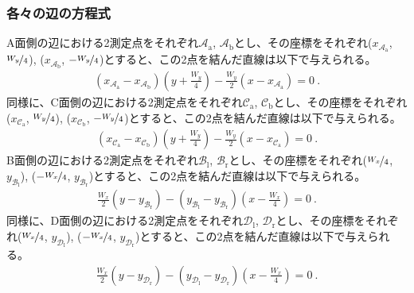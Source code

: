 \subsubsection{各々の辺の方程式}
A面側の辺における2測定点をそれぞれ$\mathcal A_\mathrm a$, $\mathcal A_\mathrm b$とし、その座標をそれぞれ($x_{\mathcal A_\mathrm a}$, $\nicefrac{W_y}4$), ($x_{\mathcal A_\mathrm b}$, $-\nicefrac{W_y}4$)とすると、この2点を結んだ直線は以下で与えられる。
\begin{align*}
  \left(x_{\mathcal A_\mathrm a}-x_{\mathcal A_\mathrm b}\right)\left(y+\frac{W_y}4\right)
  -\frac{W_y}2\left(x-x_{\mathcal A_\mathrm a}\right)
  = 0\ .
\end{align*}
同様に、C面側の辺における2測定点をそれぞれ$\mathcal C_\mathrm a$, $\mathcal C_\mathrm b$とし、その座標をそれぞれ($x_{\mathcal C_\mathrm a}$, $\nicefrac{W_y}4$), ($x_{\mathcal C_\mathrm b}$, $-\nicefrac{W_y}4$)とすると、この2点を結んだ直線は以下で与えられる。
\begin{align*}
  \left(x_{\mathcal C_\mathrm a}-x_{\mathcal C_\mathrm b}\right)\left(y+\frac{W_y}4\right)
  -\frac{W_y}2\left(x-x_{\mathcal C_\mathrm a}\right)
  = 0\ .
\end{align*}
B面側の辺における2測定点をそれぞれ$\mathcal B_\mathrm l$, $\mathcal B_\mathrm r$とし、その座標をそれぞれ($\nicefrac{W_x}4$, $y_{\mathcal B_\mathrm l}$), ($-\nicefrac{W_x}4$, $y_{\mathcal B_\mathrm r}$)とすると、この2点を結んだ直線は以下で与えられる。
\begin{align*}
  \frac{W_x}2\left(y-y_{\mathcal B_\mathrm r}\right)
  -\left(y_{\mathcal B_\mathrm l}-y_{\mathcal B_\mathrm r}\right)\left(x-\frac{W_x}4\right)
  = 0\ .
\end{align*}
同様に、D面側の辺における2測定点をそれぞれ$\mathcal D_\mathrm l$, $\mathcal D_\mathrm r$とし、その座標をそれぞれ($\nicefrac{W_x}4$, $y_{\mathcal D_\mathrm l}$), ($-\nicefrac{W_x}4$, $y_{\mathcal D_\mathrm r}$)とすると、この2点を結んだ直線は以下で与えられる。
\begin{align*}
  \frac{W_x}2\left(y-y_{\mathcal D_\mathrm r}\right)
  -\left(y_{\mathcal D_\mathrm l}-y_{\mathcal D_\mathrm r}\right)\left(x-\frac{W_x}4\right)
  = 0\ .
\end{align*}

\clearpage
